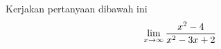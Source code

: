 Kerjakan pertanyaan dibawah ini
\begin{equation}
\lim_{x\to\infty} \frac{x^2-4}{x^2-3x+2} \\ \nonumber
\end{equation}
